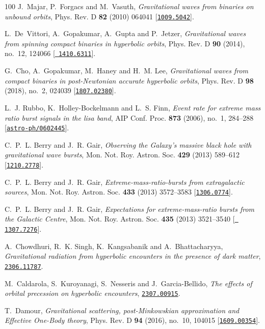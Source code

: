 \begin{thebibliography}{100}
J.~Majar, P.~Forgacs and M.~Vasuth,  {\em {Gravitational waves from binaries on
  unbound orbits}}, Phys. Rev. D {\bf 82} (2010) 064041
  [\href{http://www.arXiv.org/abs/1009.5042}{{\tt 1009.5042}}].

L.~De~Vittori, A.~Gopakumar, A.~Gupta and P.~Jetzer,  {\em {Gravitational waves
  from spinning compact binaries in hyperbolic orbits}}, Phys. Rev. D {\bf 90}
  (2014), no.~12, 124066 [\href{http://www.arXiv.org/abs/1410.6311}{{\tt
  1410.6311}}].

G.~Cho, A.~Gopakumar, M.~Haney and H.~M. Lee,  {\em {Gravitational waves from
  compact binaries in post-Newtonian accurate hyperbolic orbits}}, Phys. Rev. D
  {\bf 98} (2018), no.~2, 024039
  [\href{http://www.arXiv.org/abs/1807.02380}{{\tt 1807.02380}}].

L.~J. Rubbo, K.~Holley-Bockelmann and L.~S. Finn,  {\em {Event rate for extreme
  mass ratio burst signals in the lisa band}}, AIP Conf. Proc. {\bf 873}
  (2006), no.~1, 284--288
  [\href{http://www.arXiv.org/abs/astro-ph/0602445}{{\tt astro-ph/0602445}}].

C.~P.~L. Berry and J.~R. Gair,  {\em {Observing the Galaxy's massive black hole
  with gravitational wave bursts}}, Mon. Not. Roy. Astron. Soc. {\bf 429}
  (2013) 589--612 [\href{http://www.arXiv.org/abs/1210.2778}{{\tt 1210.2778}}].

C.~P.~L. Berry and J.~R. Gair,  {\em {Extreme-mass-ratio-bursts from
  extragalactic sources}}, Mon. Not. Roy. Astron. Soc. {\bf 433} (2013)
  3572--3583 [\href{http://www.arXiv.org/abs/1306.0774}{{\tt 1306.0774}}].

C.~P.~L. Berry and J.~R. Gair,  {\em {Expectations for extreme-mass-ratio
  bursts from the Galactic Centre}}, Mon. Not. Roy. Astron. Soc. {\bf 435}
  (2013) 3521--3540 [\href{http://www.arXiv.org/abs/1307.7276}{{\tt
  1307.7276}}].

A.~Chowdhuri, R.~K. Singh, K.~Kangsabanik and A.~Bhattacharyya,  {\em
  {Gravitational radiation from hyperbolic encounters in the presence of dark
  matter}}, \href{http://www.arXiv.org/abs/2306.11787}{{\tt 2306.11787}}.

M.~Caldarola, S.~Kuroyanagi, S.~Nesseris and J.~Garcia-Bellido,  {\em {The
  effects of orbital precession on hyperbolic encounters}},
  \href{http://www.arXiv.org/abs/2307.00915}{{\tt 2307.00915}}.

T.~Damour,  {\em {Gravitational scattering, post-Minkowskian approximation and
  Effective One-Body theory}}, Phys. Rev. D {\bf 94} (2016), no.~10, 104015
  [\href{http://www.arXiv.org/abs/1609.00354}{{\tt 1609.00354}}].


\end{thebibliography}
